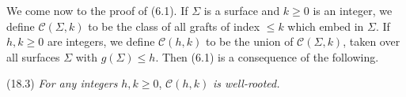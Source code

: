 We come now to the proof of (6.1). If $\Sigma$ is a surface and $k \ge 0$ is an integer, we define $\mathscr{C}(\Sigma, k)$ to be the class of all grafts of index $\le k$ which embed in $\Sigma$. If $h, k \ge 0$ are integers, we define $\mathscr{C}(h, k)$ to be the union of $\mathscr{C}(\Sigma, k)$, taken over all surfaces $\Sigma$ with $g(\Sigma) \le h$. Then (6.1) is a consequence of the following.

\stmt
(18.3) \textit{For any integers} $h, k \ge 0$, $\mathscr{C}(h, k)$ \textit{is well-rooted.}
